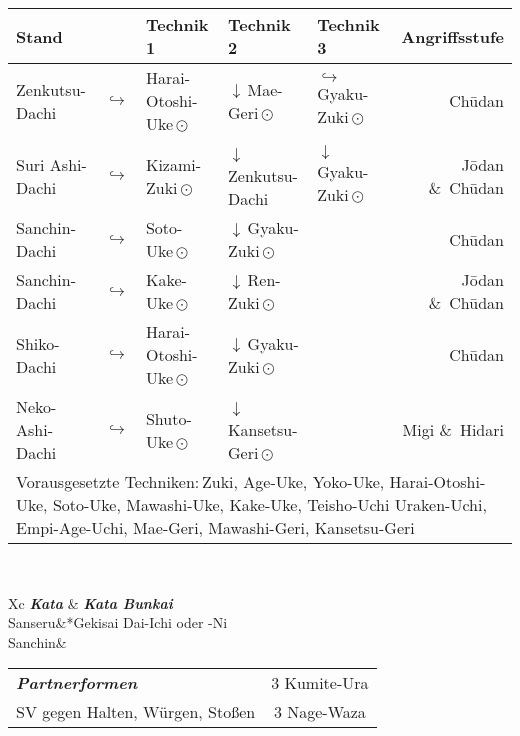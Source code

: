 \null\vfill\null
	\begin{tabularx}{\textwidth}{llllXr}
		\textbf{Stand} 	&  	& \textbf{Technik 1} & \textbf{Technik 2} 				& \textbf{Technik 3}& \textbf{Angriffsstufe}\\
		\midrule
		Zenkutsu-Dachi 	& \(\hookrightarrow\)	& Harai-Otoshi-Uke\,\(\odot\) 	& \(\downarrow\)\,Mae-Geri\,\(\odot\)	& \(\hookrightarrow\) 	 Gyaku-Zuki\,\(\odot\)	& Ch\={u}dan \\
		Suri Ashi-Dachi	& \(\hookrightarrow\)	& Kizami-Zuki\,\(\odot\)		& \(\downarrow\)\,Zenkutsu-Dachi & \(\downarrow\)	 Gyaku-Zuki\,\(\odot\)	& J\={o}dan \&~Ch\={u}dan \\
		Sanchin-Dachi 	& \(\hookrightarrow\)	& Soto-Uke\,\(\odot\) 			& \(\downarrow\)\,Gyaku-Zuki\,\(\odot\) 				&						&	 					 Ch\={u}dan \\
		Sanchin-Dachi 	& \(\hookrightarrow\)	& Kake-Uke\,\(\odot\) 			& \(\downarrow\)\,Ren-Zuki\,\(\odot\) 					&						& 						 J\={o}dan \&~Ch\={u}dan \\
		Shiko-Dachi 	& \(\hookrightarrow\)	& Harai-Otoshi-Uke\,\(\odot\) 	& \(\downarrow\)\,Gyaku-Zuki\,\(\odot\) 				&						& 						 Ch\={u}dan \\
		Neko-Ashi-Dachi	& \(\hookrightarrow\)	& Shuto-Uke\,\(\odot\) 			& \(\downarrow\)\,Kansetsu-Geri\,\(\odot\) 					&						& 						 Migi \&~Hidari  \\
		\midrule
		\multicolumn{6}{p{\linewidth-2\tabcolsep}}{{\footnotesize Vorausgesetzte Techniken:\,Zuki, Age-Uke, Yoko-Uke, Harai-Otoshi-Uke, Soto-Uke, Mawashi-Uke, Kake-Uke, Teisho-Uchi Uraken-Uchi, Empi-Age-Uchi, Mae-Geri, Mawashi-Geri, Kansetsu-Geri}}\\
		\midrule
	\end{tabularx}\\
	\null\vfill\null
	\begin{minipage}[t]{0.45\textwidth}
			\begin{tabularx}{\textwidth}{Xc}
				\midrule
				\textbf{\textit{Kata}} & \textbf{\textit{Kata Bunkai}} \\
				Sanseru&*{Gekisai Dai-Ichi oder -Ni}\\
				Sanchin& \\
				\midrule
			\end{tabularx}
		\end{minipage}
	\null\hfill\null
	\begin{minipage}[t]{0.45\textwidth}
		\begin{tabularx}{\textwidth}{Xc}
			\midrule
			{\textbf{\textit{Partnerformen}}} & 3 Kumite-Ura\\
			SV gegen Halten, Würgen, Stoßen & 3 Nage-Waza  \\
			\midrule
		\end{tabularx}
	\end{minipage}\\
